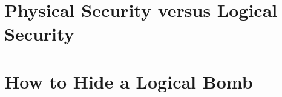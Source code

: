 \documentclass{report}
\begin{document}
	
	\section{Physical Security versus Logical Security}
	\startsection
		\cite{YouTubePP}
	\closesection
	
	\section{How to Hide a Logical Bomb}
	\startsection
	\closesection
	
	{\let\clearpage\relax }
\end{document}
